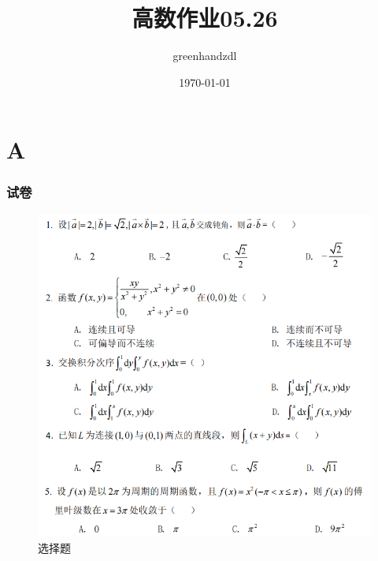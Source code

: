 \documentclass[a4paper,12pt]{ctexrep}
\begin{document}
\title{高数作业05.26}
\author{greenhandzdl}
\date{\today}
\maketitle

\tableofcontents
\newpage
{}

\part{A}
\section{试卷}

\begin{figure}[H] %
\centering %
\includegraphics[width=1\textwidth]{20250526/1.png} %
\caption{选择题} %
\end{figure}
\end{document}
